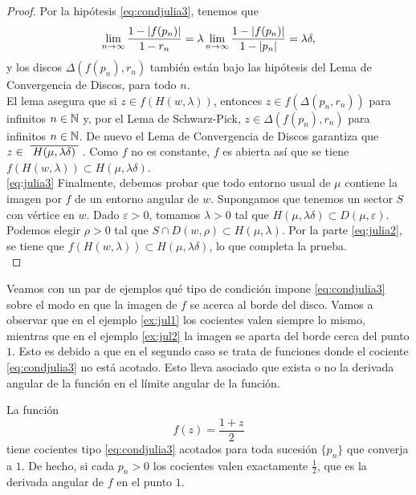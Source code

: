 \begin{proof}
    Por la hipótesis \eqref{eq:condjulia3}, tenemos que
    \begin{equation*}
        \lim_{n \to \infty} \frac{1-\left\lvert f(p_n)\right\rvert}{1-r_n} = \lambda \lim_{n \to \infty} \frac{1-\left\lvert f(p_n)\right\rvert}{1-\left\lvert p_n\right\rvert} = \lambda \delta,
    \end{equation*}
    y los discos $\Delta(f(p_n), r_n)$ también están bajo las hipótesis del Lema de Convergencia de Discos, para todo $n$. \\

    El lema asegura que si $z \in f(H(w, \lambda))$, entonces $z \in f(\Delta(p_n, r_n))$ para infinitos $n \in \mathbb{N}$ y, por el Lema de Schwarz-Pick, $z \in \Delta(f(p_n), r_n)$ para infinitos $n \in \mathbb{N}$. De nuevo el Lema de Convergencia de Discos garantiza que $z \in \xbar{H(\mu, \lambda \delta)}$. Como $f$ no es constante, $f$ es abierta así que se tiene $f(H(w, \lambda)) \subset H(\mu, \lambda \delta)$. \\

    \eqref{eq:julia3} Finalmente, debemos probar que todo entorno usual de $\mu$ contiene la imagen por $f$ de un entorno angular de $w$. Supongamos que tenemos un sector $S$ con vértice en $w$. Dado $\varepsilon > 0$, tomamos $\lambda > 0$ tal que $H(\mu, \lambda \delta) \subset D(\mu, \varepsilon)$. Podemos elegir $\rho > 0$ tal que $S \cap D(w, \rho) \subset H(\mu, \lambda)$. Por la parte \eqref{eq:julia2}, se tiene que $f(H(w, \lambda)) \subset H(\mu, \lambda \delta)$, lo que completa la prueba. \\
\end{proof}

Veamos con un par de ejemplos qué tipo de condición impone \eqref{eq:condjulia3} sobre el modo en que la imagen de $f$ se acerca al borde del disco. Vamos a observar que en el ejemplo \ref{ex:jul1} los cocientes valen siempre lo mismo, mientras que en el ejemplo \ref{ex:jul2} la imagen se aparta del borde cerca del punto $1$. Esto es debido a que en el segundo caso se trata de funciones donde el cociente \eqref{eq:condjulia3} no está acotado. Esto lleva asociado que exista o no la derivada angular de la función en el límite angular de la función. \\

\begin{example}
    \label{ex:jul1}
    La función
    \begin{equation*}
        f(z) = \frac{1 + z}{2}
    \end{equation*}
    tiene cocientes tipo \eqref{eq:condjulia3} acotados para toda sucesión $\{p_n\}$ que converja a $1$. De hecho, si cada $p_n > 0$ los cocientes valen exactamente $\frac{1}{2}$, que es la derivada angular de $f$ en el punto $1$. \\
\end{example}

